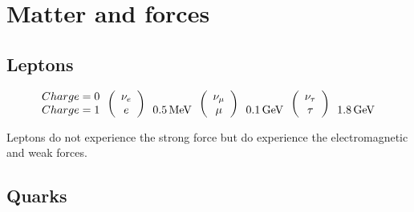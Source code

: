 \chapter[Matter and forces]{Matter and forces}

\section{Leptons}

\[
  \begin{array}{ccccccc}
    \begin{array}{c}
    Charge = 0 \\
    Charge = 1
    \end{array}
    
  \left(
    \begin{array}{c}
    \nu_e \\
    e
    \end{array}
  \right)
  
    \begin{array}{c}
    \\
    0.5 \mathrm{\,MeV}
    \end{array}
  
  \left(
    \begin{array}{c}
    \nu_{\mu} \\
    \mu
    \end{array}
  \right)
  
    \begin{array}{c}
    \\
    0.1 \mathrm{\,GeV}
    \end{array}
  
  \left(
    \begin{array}{c}
    \nu_{\tau} \\
    \tau
    \end{array}
  \right)
  
    \begin{array}{c}
    \\
    1.8 \mathrm{\,GeV}
    \end{array}
  \end{array}
\]

Leptons do not experience the strong force but do experience the electromagnetic and weak forces.

\section{Quarks}

